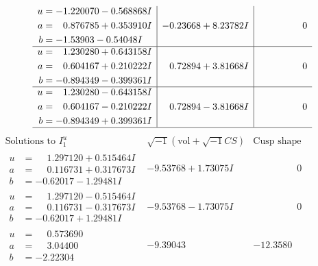 \documentclass[1p]{elsarticle_modified}
\theoremstyle{definition}
\newcommand{\I}{\sqrt{-1}}
\begin{document}
$$\begin{array}{c|c|c}
\begin{aligned}
u &= -1.220070 - 0.568868 I \\
a &= \phantom{-}0.876785 + 0.353910 I \\
b &= -1.53903 - 0.54048 I\end{aligned}
 & -0.23668 + 8.23782 I & \phantom{-0.000000 } 0 \\ \hline\begin{aligned}
u &= \phantom{-}1.230280 + 0.643158 I \\
a &= \phantom{-}0.604167 + 0.210222 I \\
b &= -0.894349 - 0.399361 I\end{aligned}
 & \phantom{-}0.72894 + 3.81668 I & \phantom{-0.000000 } 0 \\ \hline\begin{aligned}
u &= \phantom{-}1.230280 - 0.643158 I \\
a &= \phantom{-}0.604167 - 0.210222 I \\
b &= -0.894349 + 0.399361 I\end{aligned}
 & \phantom{-}0.72894 - 3.81668 I & \phantom{-0.000000 } 0\\
 \hline 
 \end{array}$$\newpage$$\begin{array}{c|c|c}  
\text{Solutions to }I^u_{1}& \I (\text{vol} + \sqrt{-1}CS) & \text{Cusp shape}\\
 \hline 
\begin{aligned}
u &= \phantom{-}1.297120 + 0.515464 I \\
a &= \phantom{-}0.116731 + 0.317673 I \\
b &= -0.62017 - 1.29481 I\end{aligned}
 & -9.53768 + 1.73075 I & \phantom{-0.000000 } 0 \\ \hline\begin{aligned}
u &= \phantom{-}1.297120 - 0.515464 I \\
a &= \phantom{-}0.116731 - 0.317673 I \\
b &= -0.62017 + 1.29481 I\end{aligned}
 & -9.53768 - 1.73075 I & \phantom{-0.000000 } 0 \\ \hline\begin{aligned}
u &= \phantom{-}0.573690\phantom{ +0.000000I} \\
a &= \phantom{-}3.04400\phantom{ +0.000000I} \\
b &= -2.22304\phantom{ +0.000000I}\end{aligned}
 & -9.39043\phantom{ +0.000000I} & -12.3580\phantom{ +0.000000I} \\ \hline\begin{aligned}

\end{aligned}
\end{array}$$
\end{document}
